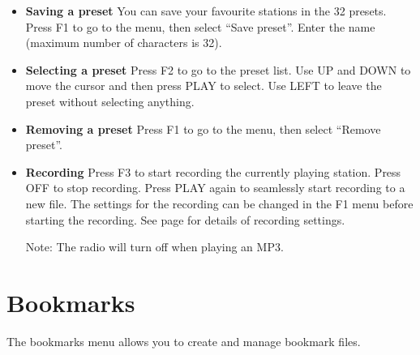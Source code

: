 \begin{itemize}

\item \textbf{Saving a preset}
You can save your favourite stations in the 32
presets. Press F1 to go to the menu, then select
``Save preset''. Enter the name (maximum number
of characters is 32).

\item \textbf{Selecting a preset}
Press F2 to go to the preset list. Use UP and DOWN to move the cursor
and then press PLAY to select. Use LEFT to leave the preset without
selecting anything.

\item \textbf{Removing a preset}
Press F1 to go to the menu, then select ``Remove preset''.

\item \textbf{Recording}
Press F3 to start recording the currently playing station. Press OFF to
stop recording. Press PLAY again to seamlessly start recording to a new
file. The settings for the recording can be changed in the F1 menu
before starting the recording. See page \pageref{ref:Recordingsettings}
for details of recording settings.

Note: The radio will turn off when playing an MP3.
\end{itemize}

\section{\label{ref:Bookmarkconfig}\label{ref:Bookmarkmenu}Bookmarks}
The bookmarks menu allows you to create and manage bookmark files.

